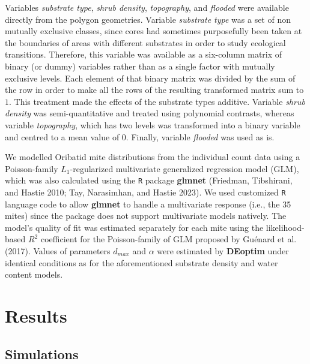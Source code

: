 \documentclass[
]{article}
\begin{document}
Variables \emph{substrate type}, \emph{shrub density},
\emph{topography}, and \emph{flooded} were available directly from the
polygon geometries. Variable \emph{substrate type} was a set of non
mutually exclusive classes, since cores had sometimes purposefully been
taken at the boundaries of areas with different substrates in order to
study ecological transitions. Therefore, this variable was available as
a six-column matrix of binary (or dummy) variables rather than as a
single factor with mutually exclusive levels. Each element of that
binary matrix was divided by the sum of the row in order to make all the
rows of the resulting transformed matrix sum to \(1\). This treatment
made the effects of the substrate types additive. Variable \emph{shrub
density} was semi-quantitative and treated using polynomial contrasts,
whereas variable \emph{topography}, which has two levels was transformed
into a binary variable and centred to a mean value of \(0\). Finally,
variable \emph{flooded} was used as is.

We modelled Oribatid mite distributions from the individual count data
using a Poisson-family \(L_1\)-regularized multivariate generalized
regression model (GLM), which was also calculated using the \texttt{R}
package \textbf{glmnet} (Friedman, Tibshirani, and Hastie 2010; Tay,
Narasimhan, and Hastie 2023). We used customized \texttt{R} language
code to allow \textbf{glmnet} to handle a multivariate response (i.e.,
the 35 mites) since the package does not support multivariate models
natively. The model's quality of fit was estimated separately for each
mite using the likelihood-based \(R^2\) coefficient for the
Poisson-family of GLM proposed by Guénard et al. (2017). Values of
parameters \(d_{max}\) and \(\alpha\) were estimated by \textbf{DEoptim}
under identical conditions as for the aforementioned substrate density
and water content models.

\section{Results}\label{results}

\subsection{Simulations}\label{simulations}
\end{document}
